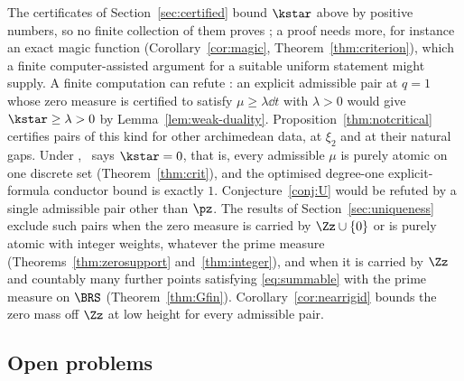 The certificates of Section~\ref{sec:certified} bound $\kstar$ above by positive numbers, so no finite collection of them proves \condS; a
proof needs more, for instance an exact magic function (Corollary~\ref{cor:magic}, Theorem~\ref{thm:criterion}), which a finite
computer-assisted argument for a suitable uniform statement might supply. A finite computation can refute \condS: an explicit admissible pair at
$q=1$ whose zero measure is certified to satisfy $\mu\ge\lambda\dd t$ with $\lambda>0$ would give $\kstar\ge\lambda>0$ by
Lemma~\ref{lem:weak-duality}. Proposition~\ref{thm:notcritical}
certifies pairs of this kind for other archimedean data, at $\xi_2$ and at their natural gaps. Under \condE, \condS\ says $\kstar=0$, that is, every
admissible $\mu$ is purely atomic on one discrete set (Theorem~\ref{thm:crit}), and the optimised degree-one explicit-formula conductor
bound is exactly $1$. Conjecture~\ref{conj:U} would be refuted by a single admissible pair other than $\pz$. The results of
Section~\ref{sec:uniqueness} exclude such pairs when the zero measure is carried by $\Zz\cup\{0\}$ or is purely atomic with integer weights,
whatever the prime measure (Theorems~\ref{thm:zerosupport} and~\ref{thm:integer}), and when it is carried by $\Zz$ and countably many further
points satisfying \eqref{eq:summable} with the prime measure on $\BRS$ (Theorem~\ref{thm:Gfin}). Corollary~\ref{cor:nearrigid} bounds the zero mass off $\Zz$ at low height for every
admissible pair.

\subsection{Open problems}

